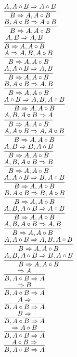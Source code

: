 \documentclass[11pt]{article}
\begin{document}
\begin{center}
\bigskip
\\$\infer{B\Rightarrow A, A\circ B}{A, A\circ B\Rightarrow A\circ B}$
\bigskip
\\$\infer{B\Rightarrow A, A\circ B}{B, A\circ B\Rightarrow A\circ B}$
\bigskip
\\$\infer{B\Rightarrow A, A\circ B}{A, B\Rightarrow A, B}$
\bigskip
\\$\infer{B\Rightarrow A, A\circ B}{A\Rightarrow A, B, A\circ B}$
\bigskip
\\$\infer{B\Rightarrow A, A\circ B}{A, A\circ B\Rightarrow A, B}$
\bigskip
\\$\infer{B\Rightarrow A, A\circ B}{B, A\circ B\Rightarrow A, B}$
\bigskip
\\$\infer{B\Rightarrow A, A\circ B}{A\circ B\Rightarrow A, B, A\circ B}$
\bigskip
\\$\infer{B\Rightarrow A, A\circ B}{A, B, A\circ B\Rightarrow A}$
\bigskip
\\$\infer{B\Rightarrow A, A\circ B}{A, A\circ B\Rightarrow A, A\circ B}$
\bigskip
\\$\infer{B\Rightarrow A, A\circ B}{A, B\Rightarrow B, A\circ B}$
\bigskip
\\$\infer{B\Rightarrow A, A\circ B}{A, B, A\circ B\Rightarrow B}$
\bigskip
\\$\infer{B\Rightarrow A, A\circ B}{A, A\circ B\Rightarrow B, A\circ B}$
\bigskip
\\$\infer{B\Rightarrow A, A\circ B}{B, A\circ B\Rightarrow B, A\circ B}$
\bigskip
\\$\infer{B\Rightarrow A, A\circ B}{A, B, A\circ B\Rightarrow A\circ B}$
\bigskip
\\$\infer{B\Rightarrow A, A\circ B}{A, B, A\circ B\Rightarrow A, B}$
\bigskip
\\$\infer{B\Rightarrow A, A\circ B}{A, A\circ B\Rightarrow A, B, A\circ B}$
\bigskip
\\$\infer{B\Rightarrow A, A\circ B}{A, B, A\circ B\Rightarrow B, A\circ B}$
\bigskip
\\$\infer{B, A\circ B\Rightarrow A}{\Rightarrow A}$
\bigskip
\\$\infer{B, A\circ B\Rightarrow A}{\Rightarrow B}$
\bigskip
\\$\infer{B, A\circ B\Rightarrow A}{A\Rightarrow }$
\bigskip
\\$\infer{B, A\circ B\Rightarrow A}{B\Rightarrow }$
\bigskip
\\$\infer{B, A\circ B\Rightarrow A}{\Rightarrow A\circ B}$
\bigskip
\\$\infer{B, A\circ B\Rightarrow A}{A\circ B\Rightarrow }$

\end{center}
\end{document}
